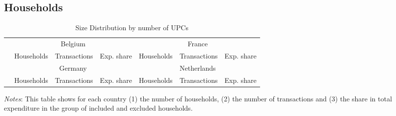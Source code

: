 \subsection{Households}
\begin{table}[H]
	\centering		
	\caption{Size Distribution by number of UPCs}
    \label{tab: app_households_excluded}
	\begin{spacing}{1.1}
        \begin{tabular}{lrrrrrr} \toprule
            & \multicolumn{3}{c}{Belgium} & \multicolumn{3}{c}{France} \\ 
                \cmidrule(lr){2-4} \cmidrule(lr){5-7} 
            &   Households & Transactions & Exp. share &
                Households & Transactions & Exp. share\\ \midrule
		    
            & \multicolumn{3}{c}{Germany} & \multicolumn{3}{c}{Netherlands} \\ 
                \cmidrule(lr){2-4} \cmidrule(lr){5-7} 
            &   Households & Transactions & Exp. share &
                Households & Transactions & Exp. share\\ \midrule
           
	    \end{tabular}
    \end{spacing}
    \parbox{\textwidth}{
        \begin{spacing}{1} 
            {\footnotesize 
            \textit{Notes}: This table shows for each country (1) the number of households, (2) the number of transactions and (3) the share in total expenditure in the group of included and excluded households.}
        \end{spacing}}
\end{table}
